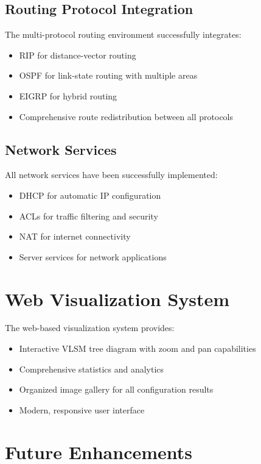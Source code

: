 \documentclass[12pt,a4paper]{report}
\begin{document}
\subsection{Routing Protocol Integration}

The multi-protocol routing environment successfully integrates:
\begin{itemize}
    \item RIP for distance-vector routing
    \item OSPF for link-state routing with multiple areas
    \item EIGRP for hybrid routing
    \item Comprehensive route redistribution between all protocols
\end{itemize}

\subsection{Network Services}

All network services have been successfully implemented:
\begin{itemize}
    \item DHCP for automatic IP configuration
    \item ACLs for traffic filtering and security
    \item NAT for internet connectivity
    \item Server services for network applications
\end{itemize}

\section{Web Visualization System}

The web-based visualization system provides:
\begin{itemize}
    \item Interactive VLSM tree diagram with zoom and pan capabilities
    \item Comprehensive statistics and analytics
    \item Organized image gallery for all configuration results
    \item Modern, responsive user interface
\end{itemize}

\section{Future Enhancements}
\end{document}
